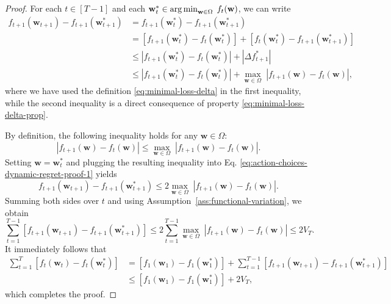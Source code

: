 \begin{proof}
For each $t \in [T-1]$ and each $\mathbf{w}_t^* \in \operatorname*{arg\,min}_{\mathbf{w}\in\Omega}\; f_t(\mathbf{w})$, we can write
\begin{align}
	f_{t+1}(\mathbf{w}_{t+1}) - f_{t+1}(\mathbf{w}_{t+1}^*)
	&= f_{t+1}(\mathbf{w}_t^*) - f_{t+1}(\mathbf{w}_{t+1}^*)
	\nonumber \\
	&= [f_{t+1}(\mathbf{w}_t^*) - f_t(\mathbf{w}_t^*)] + [f_t(\mathbf{w}_t^*) - f_{t+1}(\mathbf{w}_{t+1}^*)]
	\nonumber \\	
	&\leq |f_{t+1}(\mathbf{w}_t^*) - f_t(\mathbf{w}_t^*)| + |\Delta f_{t+1}^*|
	\nonumber \\
	&\leq |f_{t+1}(\mathbf{w}_t^*) - f_t(\mathbf{w}_t^*)| + \max_{\mathbf{w}\in\Omega} \; |f_{t+1}(\mathbf{w}) - f_t(\mathbf{w})|,
	\label{eq:action-choices-dynamic-regret-proof-1}
\end{align}
where we have used the definition \eqref{eq:minimal-loss-delta} in the first inequality, while the second inequality is a direct consequence of property \eqref{eq:minimal-loss-delta-prop}.

By definition, the following inequality holds for any $\mathbf{w}\in\Omega$:
\begin{equation}
	|f_{t+1}(\mathbf{w}) - f_t(\mathbf{w})|
	\leq \max_{\mathbf{w}\in\Omega} \; |f_{t+1}(\mathbf{w}) - f_t(\mathbf{w})|.
\end{equation}
Setting $\mathbf{w} = \mathbf{w}_t^*$ and plugging the resulting inequality into Eq. \eqref{eq:action-choices-dynamic-regret-proof-1} yields
\begin{equation}
	f_{t+1}(\mathbf{w}_{t+1}) - f_{t+1}(\mathbf{w}_{t+1}^*) \leq 2\max_{\mathbf{w}\in\Omega} \; |f_{t+1}(\mathbf{w}) - f_t(\mathbf{w})|.
\end{equation}
Summing both sides over $t$ and using Assumption~\ref{ass:functional-variation}, we obtain
\begin{equation}
	\sum_{t=1}^{T-1}[f_{t+1}(\mathbf{w}_{t+1}) - f_{t+1}(\mathbf{w}_{t+1}^*)]
	\leq 2\sum_{t=1}^{T-1}\max_{\mathbf{w}\in\Omega} \; |f_{t+1}(\mathbf{w}) - f_t(\mathbf{w})|
	\leq 2V_T.
\end{equation}
It immediately follows that
\begin{equation}
\begin{split}
	\sum_{t=1}^{T}[f_t(\mathbf{w}_t) - f_t(\mathbf{w}_t^*)]
	&= [f_1(\mathbf{w}_1) - f_1(\mathbf{w}_1^*)]
	+ \sum_{t=1}^{T-1}[f_{t+1}(\mathbf{w}_{t+1}) - f_{t+1}(\mathbf{w}_{t+1}^*)]
	\\
	&\leq [f_1(\mathbf{w}_1) - f_1(\mathbf{w}_1^*)]
	+ 2V_T,
\end{split}
\end{equation}
which completes the proof.
\end{proof}

